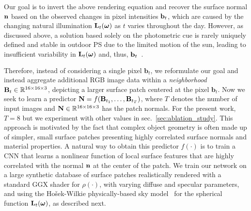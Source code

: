 Our goal is to invert the above rendering equation and recover the surface normal ${\bf n}$ based on the observed changes in pixel intensities ${\bf b}_t$, which are caused by the changing natural illumination ${\bf L}_t(\mathbf{\boldsymbol \omega})$ as $t$ varies throughout the day. However, as discussed above, a solution based solely on the photometric cue is rarely uniquely defined and stable in outdoor PS due to the limited motion of the sun, leading to insufficient variability in ${\bf L}_t(\mathbf{\boldsymbol \omega})$ and, thus, ${\bf b}_t$~\cite{holdgeoffroy-3dv-15}.

Therefore, instead of considering a single pixel $\mathbf{b}_t$, we reformulate our goal and instead aggregate additional RGB image data within a \emph{neighborhood} ${\bf B}_t \in \mathbb{R}^{16 \times 16 \times 3}$, depicting a larger surface patch centered at the pixel $\mathbf{b}_t$. Now we seek to learn a predictor ${\bf N} = f({\bf B}_{t_1}, \ldots, {\bf B}_{t_T})$, where $T$ denotes the number of input images and ${\bf N} \in \mathbb{R}^{16\times 16\times 3}$ has the patch normals. For the present work, $T=8$ but we experiment with other values in sec.~\ref{sec:ablation_study}. This approach is motivated by the fact that complex object geometry is often made up of simpler, small surface patches presenting highly correlated surface normals and material properties. A natural way to obtain this predictor $f(\cdot)$ is to train a CNN that learns a nonlinear function of local surface features that are highly correlated with the normal ${\bf n}$ at the center of the patch. We train our network on a large synthetic database of surface patches realistically rendered with a standard GGX shader for $\rho(\cdot)$, with varying diffuse and specular parameters, and using the Ho\v{s}ek-Wilkie physically-based sky model~\cite{hosek-siggraph-12} for the spherical function ${\bf L}_t(\mathbf{\boldsymbol \omega})$, as described next.





